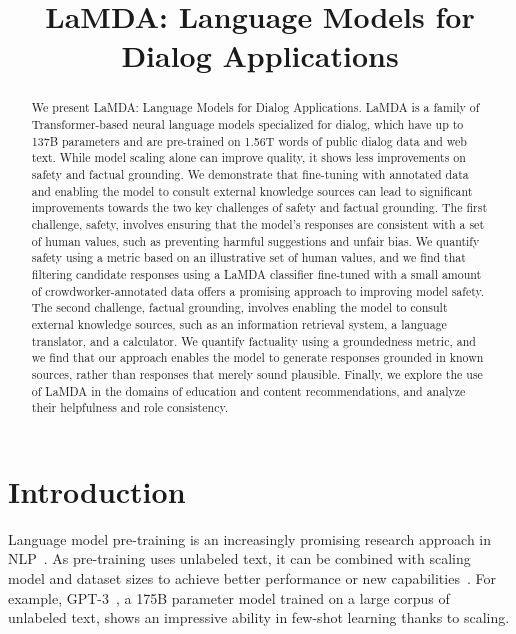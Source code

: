 \title{LaMDA: Language Models for Dialog Applications}

\begin{abstract}
We present LaMDA: Language Models for Dialog Applications. LaMDA is a family of Transformer-based neural language models specialized for dialog, which have up to 137B parameters and are pre-trained on 1.56T words of public dialog data and web text. While model scaling alone can improve quality, it shows less improvements on safety and factual grounding. We demonstrate that fine-tuning with annotated data and enabling the model to consult external knowledge sources can lead to significant improvements towards the two key challenges of safety and factual grounding. The first challenge, safety, involves ensuring that the model’s responses are consistent with a set of human values, such as preventing harmful suggestions and unfair bias. We quantify safety using a metric based on an illustrative set of human values, and we find that filtering candidate responses using a LaMDA classifier fine-tuned with a small amount of crowdworker-annotated data offers a promising approach to improving model safety. The second challenge, factual grounding, involves enabling the model to consult external knowledge sources, such as an information retrieval system, a language translator, and a calculator. We quantify factuality using a groundedness metric, and we find that our approach enables the model to generate responses grounded in known sources, rather than responses that merely sound plausible. Finally, we explore  the use of LaMDA in the domains of education and content recommendations, and analyze their helpfulness and role consistency.
\end{abstract}

\section{Introduction}

Language model pre-training is an increasingly promising research approach in NLP~\cite{kiros2015skip,dai2015semi,peters-etal-2018-deep,howard2018universal,radford2018improving,devlin2018bert,yang2019xlnet,Lan2020ALBERT,liu2019roberta,Clark2020ELECTRA,t5,gpt320}. As pre-training uses unlabeled text, it can be combined with scaling model and dataset sizes to achieve better performance or new capabilities~\cite{Kaplan2020ScalingLF}. For example, GPT-3~\cite{gpt320}, a 175B parameter model trained on a large corpus of unlabeled text, shows an impressive ability in few-shot learning thanks to scaling.

